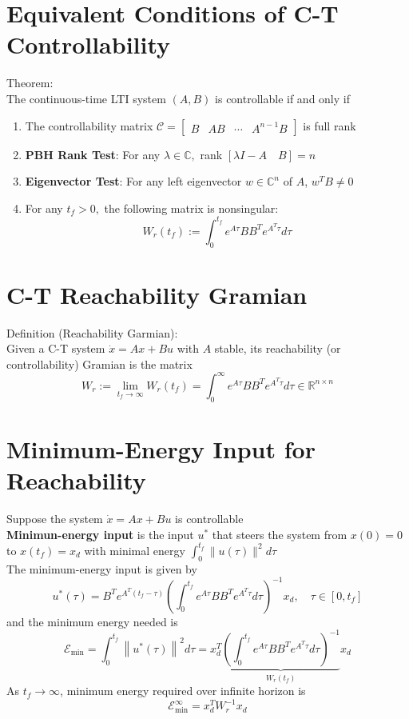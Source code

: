 \documentclass[10pt,a4paper,oneside]{article}
\begin{document}
\section{Equivalent Conditions of C-T Controllability}
Theorem:\\
The continuous-time LTI system $(A,B)$ is controllable if and only if
\begin{enumerate}
\item The controllability matrix $\mathcal{C}=\left[\begin{array}{llll}{B} & {A B} & {\cdots} & {A^{n-1} B}\end{array}\right]$ is full rank
\item  {\bfseries PBH Rank Test}: For any $\lambda \in \mathbb{C},$ rank $[\lambda I-A  \quad B ]=n$
\item {\bfseries Eigenvector Test}: For any left eigenvector $w\in\mathbb{C}^n$ of $A$, $w^TB\neq0$
\item For any $t_{f}>0,$ the following matrix is nonsingular:
\[
W_{r}\left(t_{f}\right) :=\int_{0}^{t_{f}} e^{A \tau} B B^{T} e^{A^{T} \tau} d \tau
\]
\end{enumerate}
\section{C-T Reachability Gramian}
Definition (Reachability Garmian):\\
Given a C-T system $\dot{x}=A x+B u$ with $A$ stable, its reachability (or
controllability) Gramian is the matrix
\[
W_{r} :=\lim _{t_{f} \rightarrow \infty} W_{r}\left(t_{f}\right)=\int_{0}^{\infty} e^{A \tau} B B^{T} e^{A^{T} \tau} d \tau \in \mathbb{R}^{n \times n}
\]
\section{Minimum-Energy Input for Reachability}
Suppose the system $\dot{x}=A x+B u$ is controllable\\
{\bfseries Minimun-energy input} is the input $u^*$ that steers the system from $x(0)=0$ to $x(t_f)=x_d$ with minimal energy $\int_{0}^{t_{f}}\|u(\tau)\|^{2} d \tau$\\
The minimum-energy input is given by
\[
u^{*}(\tau)=B^{T} e^{A^{T}\left(t_{f}-\tau\right)}\left(\int_{0}^{t_{f}} e^{A \tau} B B^{T} e^{A^{T} \tau} d \tau\right)^{-1} x_{d}, \quad \tau \in\left[0, t_{f}\right]
\]
and the minimum energy needed is
\[
\mathcal{E}_{\min }=\int_{0}^{t_{f}}\left\|u^{*}(\tau)\right\|^{2} d \tau=x_{d}^{T} \underbrace{\left(\int_{0}^{t_{f}} e^{A \tau} B B^{T} e^{A^{T} \tau} d \tau\right)^{-1}}_{W_{r}\left(t_{f}\right)} x_{d}
\]
As $t_f\rightarrow\infty$, minimum energy required over infinite horizon is
\[
\mathcal{E}_{\mathrm{min}}^{\infty}=x_{d}^{T} W_{r}^{-1} x_{d}
\]
\end{document}
